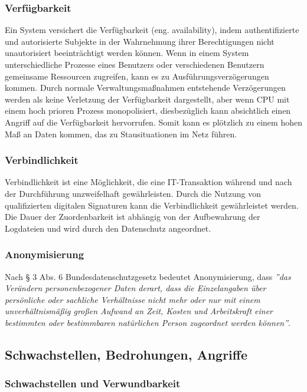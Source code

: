 \subsubsection{Verfügbarkeit}

Ein System versichert die Verfügbarkeit (eng. availability), indem authentifizierte und autorisierte Subjekte in der Wahrnehmung ihrer Berechtigungen nicht unautorisiert beeinträchtigt werden können. Wenn in einem System unterschiedliche Prozesse eines Benutzers oder verschiedenen Benutzern gemeinsame Ressourcen zugreifen, kann es zu Ausführungsverzögerungen kommen. Durch normale Verwaltungsmaßnahmen entstehende Verzögerungen werden als keine Verletzung der Verfügbarkeit dargestellt, aber wenn CPU mit einem hoch prioren Prozess monopolisiert, diesbezüglich kann absichtlich einen Angriff auf die Verfügbarkeit hervorrufen. Somit kann es plötzlich zu einem hohen Maß an Daten kommen, das zu Stausituationen im Netz führen\cite[33]{eckert2013sicherheit}.

\subsubsection{Verbindlichkeit}

Verbindlichkeit ist eine Möglichkeit, die eine IT-Transaktion während und nach der Durchführung unzweifelhaft gewährleisten. Durch die Nutzung von qualifizierten digitalen Signaturen kann die Verbindlichkeit gewährleistet werden. Die Dauer der Zuordenbarkeit ist abhängig von der Aufbewahrung der Logdateien und wird durch den Datenschutz angeordnet\cite{secupedia11}.

\subsubsection{Anonymisierung}

Nach § 3 Abs. 6 Bundesdatenschutzgesetz bedeutet Anonymisierung, dass \emph{''das Verändern personenbezogener Daten derart, dass die Einzelangaben über persönliche oder sachliche Verhältnisse nicht mehr oder nur mit einem unverhältnismäßig großen Aufwand an Zeit, Kosten und Arbeitskraft einer bestimmten oder bestimmbaren natürlichen Person zugeordnet werden können''}\cite{dsba2018}. 

\subsection{Schwachstellen, Bedrohungen, Angriffe}

\subsubsection{Schwachstellen und Verwundbarkeit}

